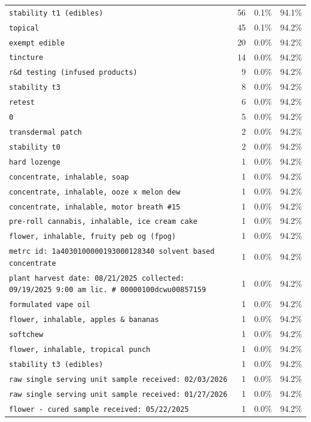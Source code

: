 \documentclass[11pt,letterpaper]{article}
\begin{document}
{\begin{tabularx}{\textwidth}{@{}Xrrr@{}}
\texttt{stability t1 (edibles)} & 56 & 0.1\% & 94.1\% \\
\texttt{topical} & 45 & 0.1\% & 94.2\% \\
\texttt{exempt edible} & 20 & 0.0\% & 94.2\% \\
\texttt{tincture} & 14 & 0.0\% & 94.2\% \\
\texttt{r\&d testing (infused products)} & 9 & 0.0\% & 94.2\% \\
\texttt{stability t3} & 8 & 0.0\% & 94.2\% \\
\texttt{retest} & 6 & 0.0\% & 94.2\% \\
\texttt{0} & 5 & 0.0\% & 94.2\% \\
\texttt{transdermal patch} & 2 & 0.0\% & 94.2\% \\
\texttt{stability t0} & 2 & 0.0\% & 94.2\% \\
\texttt{hard lozenge} & 1 & 0.0\% & 94.2\% \\
\texttt{concentrate, inhalable, soap} & 1 & 0.0\% & 94.2\% \\
\texttt{concentrate, inhalable, ooze x melon dew} & 1 & 0.0\% & 94.2\% \\
\texttt{concentrate, inhalable, motor breath \#15} & 1 & 0.0\% & 94.2\% \\
\texttt{pre-roll cannabis, inhalable, ice cream cake} & 1 & 0.0\% & 94.2\% \\
\texttt{flower, inhalable, fruity peb og (fpog)} & 1 & 0.0\% & 94.2\% \\
\texttt{metrc id: 1a4030100000193000128340 solvent based concentrate} & 1 & 0.0\% & 94.2\% \\
\texttt{plant harvest date: 08/21/2025 collected: 09/19/2025 9:00 am lic. \# 00000100dcwu00857159} & 1 & 0.0\% & 94.2\% \\
\texttt{formulated vape oil} & 1 & 0.0\% & 94.2\% \\
\texttt{flower, inhalable, apples \& bananas} & 1 & 0.0\% & 94.2\% \\
\texttt{softchew} & 1 & 0.0\% & 94.2\% \\
\texttt{flower, inhalable, tropical punch} & 1 & 0.0\% & 94.2\% \\
\texttt{stability t3 (edibles)} & 1 & 0.0\% & 94.2\% \\
\texttt{raw single serving unit sample received: 02/03/2026} & 1 & 0.0\% & 94.2\% \\
\texttt{raw single serving unit sample received: 01/27/2026} & 1 & 0.0\% & 94.2\% \\
\texttt{flower - cured sample received: 05/22/2025} & 1 & 0.0\% & 94.2\% \\
\bottomrule
\end{tabularx}
}
\end{document}
